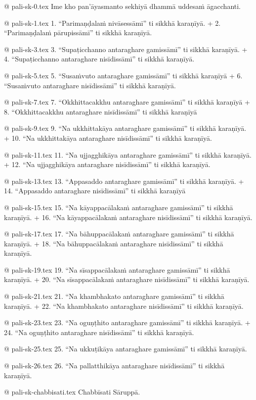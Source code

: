 @ pali-sk-0.tex
Ime kho pan’āyasmanto sekhiyā dhammā uddesaṁ āgacchanti.

@ pali-sk-1.tex
1. “Parimaṇḍalaṁ nivāsessāmī” ti sikkhā karaṇīyā. +
2. “Parimaṇḍalaṁ pārupissāmī” ti sikkhā karaṇīyā.

@ pali-sk-3.tex
3. “Supaṭicchanno antaraghare gamissāmī” ti sikkhā karaṇīyā. +
4. “Supaṭicchanno antaraghare nisīdissāmī” ti sikkhā karaṇīyā.

@ pali-sk-5.tex
5. “Susaṁvuto antaraghare gamissāmī” ti sikkhā karaṇīyā +
6. “Susaṁvuto antaraghare nisīdissāmī” ti sikkhā karaṇīyā.

@ pali-sk-7.tex
7. “Okkhittacakkhu antaraghare gamissāmī” ti sikkhā karaṇīyā +
8. “Okkhittacakkhu antaraghare nisīdissāmī” ti sikkhā karaṇīyā

@ pali-sk-9.tex
9. “Na ukkhittakāya antaraghare gamissāmī” ti sikkhā karaṇīyā. +
10. “Na ukkhittakāya antaraghare nisīdissāmī” ti sikkhā karaṇīyā.

@ pali-sk-11.tex
11. “Na ujjagghikāya antaraghare gamissāmī” ti sikkhā karaṇīyā. +
12. “Na ujjagghikāya antaraghare nisīdissāmī” ti sikkhā karaṇīyā.

@ pali-sk-13.tex
13. “Appasaddo antaraghare gamissāmī” ti sikkhā karaṇīyā. +
14. “Appasaddo antaraghare nisīdissāmī” ti sikkhā karaṇīyā

@ pali-sk-15.tex
15. “Na kāyappacālakaṁ antaraghare gamissāmī” ti sikkhā karaṇīyā. +
16. “Na kāyappacālakaṁ antaraghare nisīdissāmī” ti sikkhā karaṇīyā.

@ pali-sk-17.tex
17. “Na bāhuppacālakaṁ antaraghare gamissāmī” ti sikkhā karaṇīyā. +
18. “Na bāhuppacālakaṁ antaraghare nisīdissāmī” ti sikkhā karaṇīyā.

@ pali-sk-19.tex
19. “Na sīsappacālakaṁ antaraghare gamissāmī” ti sikkhā karaṇīyā. +
20. “Na sīsappacālakaṁ antaraghare nisīdissāmī” ti sikkhā karaṇīyā.

@ pali-sk-21.tex
21. “Na khambhakato antaraghare gamissāmī” ti sikkhā karaṇīyā. +
22. “Na khambhakato antaraghare nisīdissāmī” ti sikkhā karaṇīyā.

@ pali-sk-23.tex
23. “Na oguṇṭhito antaraghare gamissāmī” ti sikkhā karaṇīyā. +
24. “Na oguṇṭhito antaraghare nisīdissāmī” ti sikkhā karaṇīyā.

@ pali-sk-25.tex
25. “Na ukkuṭikāya antaraghare gamissāmī” ti sikkhā karaṇīyā.

@ pali-sk-26.tex
26. “Na pallatthikāya antaraghare nisīdissāmī” ti sikkhā karaṇīyā.

@ pali-sk-chabbisati.tex
Chabbīsati Sāruppā.

